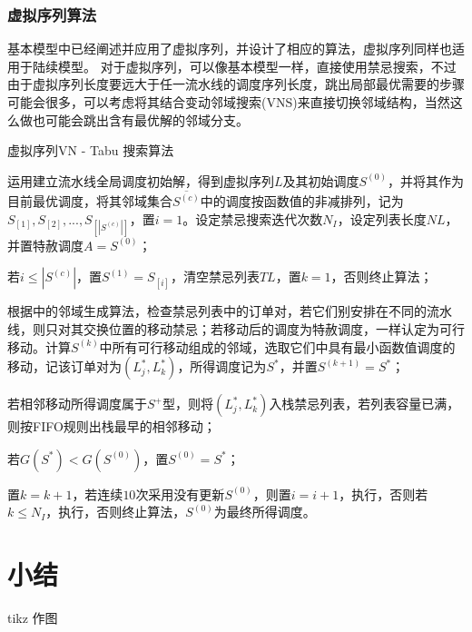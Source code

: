 \subsubsection{虚拟序列算法}
基本模型中已经阐述并应用了虚拟序列，并设计了相应的算法，虚拟序列同样也适用于陆续模型。
对于虚拟序列，可以像基本模型一样，直接使用禁忌搜索，不过由于虚拟序列长度要远大于任一流水线的调度序列长度，跳出局部最优需要的步骤可能会很多，可以考虑将其结合变动邻域搜索(VNS)来直接切换邻域结构，当然这么做也可能会跳出含有最优解的邻域分支。
\begin{algori}
虚拟序列VN - Tabu 搜索算法
\begin{asparaenum}
\renewcommand{\labelenumi}{\bf Step\theenumi~}
\item 运用建立流水线全局调度初始解，得到虚拟序列$L$及其初始调度$S^{(0)}$，并将其作为目前最优调度，将其邻域集合$\overline{S^{(c)}}$中的调度按函数值的非减排列，记为$S_{[1]},S_{[2]},...,S_{[|S^{(c)}|]}$，置$i = 1$。设定禁忌搜索迭代次数$N_I$，设定列表长度$NL$，并置特赦调度$A = S^{(0)}$；
\item 若$i \le |S^{(c)}|$，置$S^{(1)} = S_{[i]}$，清空禁忌列表$TL$，置$k = 1$，否则终止算法；
\item 根据中的邻域生成算法，检查禁忌列表中的订单对，若它们别安排在不同的流水线，则只对其交换位置的移动禁忌；若移动后的调度为特赦调度，一样认定为可行移动。计算$S^{(k)}$中所有可行移动组成的邻域，选取它们中具有最小函数值调度的移动，记该订单对为$(L_j^*, L_k^*)$，所得调度记为$S^*$，并置$S^{(k+1)} = S^*$；
\item 若相邻移动所得调度属于$S^+$型，则将$(L_j^*, L_k^*)$入栈禁忌列表，若列表容量已满，则按FIFO规则出栈最早的相邻移动；
\item 若$G(S^*) < G(S^{(0)})$，置$S^{(0)} = S^*$；
\item 置$k = k + 1$，若连续$10$次采用没有更新$S^{(0)}$，则置$i = i+1$，执行，否则若$k\le N_I$，执行，否则终止算法，$S^{(0)}$为最终所得调度。
\end{asparaenum}
\end{algori}

\section{小结}

tikz 作图
\begin{figure}[h]
\centering
{}
\end{figure}
